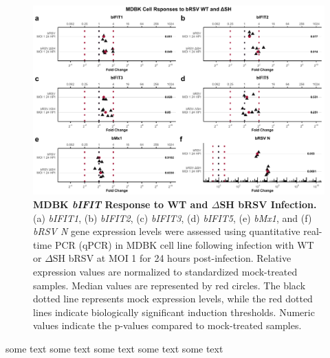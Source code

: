 \begin{figure}
    \centering
    \includegraphics[width=1\linewidth]{07. Chapter 2/Figs/02. Induction/05. mdbk_brsv_moi1_dsh.pdf}
    \caption[MDBK \textit{bIFIT} Response to WT and \(\Delta\)SH bRSV Infection.]{\textbf{MDBK \textit{bIFIT} Response to WT and \(\Delta\)SH bRSV Infection.} (a) \textit{bIFIT1}, (b) \textit{bIFIT2}, (c) \textit{bIFIT3}, (d) \textit{bIFIT5}, (e) \textit{bMx1}, and (f) \textit{bRSV N} gene expression levels were assessed using quantitative real-time PCR (qPCR) in MDBK cell line following infection with WT or \(\Delta\)SH bRSV at MOI 1 for 24 hours post-infection. Relative expression values are normalized to standardized mock-treated samples. Median values are represented by red circles. The black dotted line represents mock expression levels, while the red dotted lines indicate biologically significant induction thresholds. Numeric values indicate the p-values compared to mock-treated samples.}
    \label{fig:MDBK responses to dSH}
\end{figure}



some text some text some text some text some text

